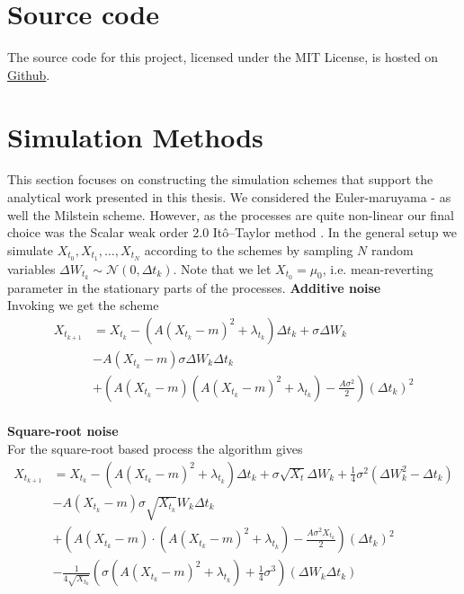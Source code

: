 \section{Source code}
The source code for this project, licensed under the MIT License, is hosted on \href{https://github.com/Gantzhorn/Thesis}{Github}.
\section{Simulation Methods}
This section focuses on constructing the simulation schemes that support the analytical work presented in this thesis. We considered the Euler-maruyama - as well the Milstein scheme. However, as the processes are quite non-linear our final choice was the Scalar weak order 2.0 Itô–Taylor method \cite[algorithm 8.5]{Srkk2019}. In the general setup we simulate $X_{t_0},X_{t_1},\dots, X_{t_N}$ according to the schemes by sampling $N$ random variables $\Delta W_{t_k}\sim\mathcal{N}\left(0, \Delta t_k\right)$. Note that we let $X_{t_0} = \mu_0$, i.e. mean-reverting parameter in the stationary parts of the processes.
\noindent \textbf{Additive noise}\\
Invoking \cite[algorithm 8.5]{Srkk2019} we get the scheme
\begin{align}
    X_{t_{k + 1}} &= X_{t_k} - \left(A(X_{t_k} - m)^2 + \lambda_{t_k}\right) \Delta t_k + \sigma \Delta W_{k} \nonumber \\&-  A \left(X_{t_k} - m\right)\sigma \Delta W_k \Delta t_k\nonumber \\
    & + \left(A\left(X_{t_k} - m\right)\left(A\left(X_{t_k} - m\right)^2 + \lambda_{t_k}\right) - \frac{A \sigma^2}{2}\right)\left(\Delta t_k\right)^2
\end{align}
\\
\textbf{Square-root noise}\\
For the square-root based process the algorithm gives 
\begin{align}
    X_{t_{k + 1}} &= X_{t_k} - \left(A(X_{t_k} - m)^2 + \lambda_{t_k}\right) \Delta t_k + \sigma \sqrt{X_t} \Delta W_{k} + \frac{1}{4}\sigma^2 \left(\Delta W_k^2 - \Delta t_k\right)\nonumber\\
    &- A\left(X_{t_k} - m\right)\sigma \sqrt{X_{t_k}} W_k \Delta t_k
    \nonumber\\
     &+ \left(A\left(X_{t_k} - m\right)\cdot \left(A\left(X_{t_k} - m\right)^2 + \lambda_{t_k}\right) - \frac{A\sigma^2 X_{t_k}}{2}\right)(\Delta t_k)^2 \nonumber\\
    &- \frac{1}{4\sqrt{X_{t_k}}}\left(\sigma\left(A\left(X_{t_k} - m\right)^2 + \lambda_{t_k}\right) + \frac{1}{4}\sigma^3\right) \left(\Delta W_k \Delta t_k\right)
\end{align}
